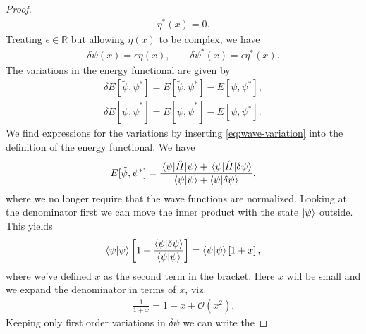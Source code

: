 \begin{proof}
\begin{gather}
{                }
                \eta^{*}(x)
                = 0.
            \end{gather}
            Treating $\epsilon \in \mathbb{R}$ but allowing $\eta(x)$ to be
            complex, we have
            \begin{gather}
                \delta\psi(x) = \epsilon\eta(x),
                \qquad
                \delta\psi^{*}(x) = \epsilon\eta^{*}(x).
            \end{gather}
            The variations in the energy functional are given by
            \begin{gather}
                \delta E[\tilde{\psi}, \psi^{*}]
                = E[\tilde{\psi}, \psi^{*}]
                - E[\psi, \psi^{*}], \\
                \delta E[\psi, \tilde{\psi}^{*}]
                = E[\psi, \tilde{\psi}^{*}]
                - E[\psi, \psi^{*}].
            \end{gather}
            We find expressions for the variations by inserting
            \autoref{eq:wave-variation} into the definition of the energy
            functional.
            We have
            \begin{align}
                E[\tilde{\psi}, \psi^{*}]
                = \frac{
                    \mel{\psi}{\hat{H}}{\psi}
                    + \mel{\psi}{\hat{H}}{\delta\psi}
                }{
                    \braket{\psi}
                    + \braket{\psi}{\delta\psi}
                },
            \end{align}
            where we no longer require that the wave functions are normalized.
            Looking at the denominator first we can move the inner product with
            the state $\ket{\psi}$ outside.
            This yields
            \begin{align}
                \braket{\psi}\left[ 
                    1 +
                    \frac{
                        \braket{\psi}{\delta\psi}
                    }{
                        \braket{\psi}
                    }
                 \right]
                = \braket{\psi}\left[ 1 + x \right],
            \end{align}
            where we've defined $x$ as the second term in the bracket.
            Here $x$ will be small and we expand the denominator in terms of
            $x$, viz.
            \begin{align}
                \frac{1}{1 + x} = 1 - x + \mathcal{O}(x^2).
            \end{align}
            Keeping only first order variations in $\delta\psi$ we can write the

\end{proof}
